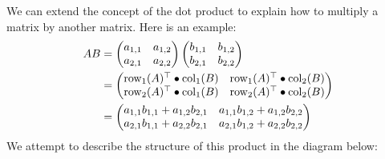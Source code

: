 \documentclass{ximera}
\begin{document}

We can extend the concept of the dot product to explain how to
multiply a matrix by another matrix. Here is an example:
\begin{align*}AB &= \begin{pmatrix}
a_{1,1} & a_{1,2}\\
a_{2,1} & a_{2,2}
\end{pmatrix}
\begin{pmatrix}
b_{1,1} & b_{1,2}\\
b_{2,1} & b_{2,2}
\end{pmatrix}\\
&= \begin{pmatrix}
\operatorname{row}_1(A)^\top \bullet\operatorname{col}_1(B) & \operatorname{row}_1(A)^\top\bullet\operatorname{col}_2(B)\\
\operatorname{row}_2(A)^\top \bullet\operatorname{col}_1(B) & \operatorname{row}_2(A)^\top\bullet\operatorname{col}_2(B)
\end{pmatrix}\\
&= \begin{pmatrix}
a_{1,1}b_{1,1} + a_{1,2}b_{2,1} & a_{1,1}b_{1,2}+ a_{1,2}b_{2,2}\\
a_{2,1}b_{1,1} + a_{2,2}b_{2,1} & a_{2,1}b_{1,2} + a_{2,2}b_{2,2}
\end{pmatrix}
\end{align*}
We attempt to describe the structure of this product in the diagram below:
\end{document}
